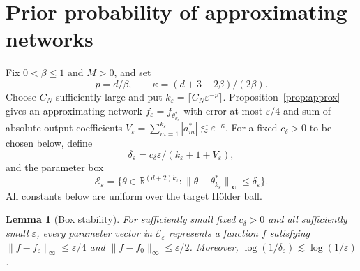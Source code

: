 \documentclass[11pt,a4paper]{article}
\newtheorem{lemma}{Lemma}
\theoremstyle{remark}
\newcommand{\norm}[1]{\lVert#1\rVert}
\begin{document}
\section{Prior probability of approximating networks}\label{app:mass}

Fix $0<\beta\leq1$ and $M>0$, and set
\begin{equation}\label{eq:exponents}
p=d/\beta,\qquad \kappa=(d+3-2\beta)/(2\beta).
\end{equation}
Choose $C_N$ sufficiently large and put
$k_\varepsilon=\lceil C_N\varepsilon^{-p}\rceil$.
Proposition~\ref{prop:approx} gives an approximating network
$f_\varepsilon=f_{\theta_{k_\varepsilon}^*}$ with error at most
$\varepsilon/4$ and sum of absolute output coefficients
$V_\varepsilon=\sum_{m=1}^{k_\varepsilon}|a_m^*|
\lesssim\varepsilon^{-\kappa}$.
For a fixed $c_\delta>0$ to be chosen below, define
\begin{equation}\label{eq:delta}
\delta_\varepsilon=c_\delta\varepsilon/
(k_\varepsilon+1+V_\varepsilon),
\end{equation}
and the parameter box
\begin{equation}\label{eq:event}
\mathcal E_\varepsilon=
\{\theta\in\mathbb R^{(d+2)k_\varepsilon}:
\norm{\theta-\theta_{k_\varepsilon}^*}_\infty
\leq\delta_\varepsilon\}.
\end{equation}
All constants below are uniform over the target H\"older ball.

\begin{lemma}[Box stability]\label{lem:stability}
For sufficiently small fixed $c_\delta>0$ and all sufficiently
small $\varepsilon$, every parameter vector in
$\mathcal E_\varepsilon$ represents a function $f$ satisfying
$\norm{f-f_\varepsilon}_\infty\leq\varepsilon/4$ and
$\norm{f-f_0}_\infty\leq\varepsilon/2$. Moreover,
$\log(1/\delta_\varepsilon)\lesssim\log(1/\varepsilon)$.
\end{lemma}
\end{document}
